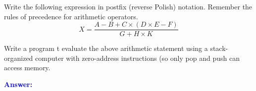 \item{}
\begin{list}{\textbf{)}}{}
    \item Write the following expression in postfix (reverse Polish) notation.
        Remember the rules of precedence for arithmetic operators.
        $$X=\frac{A-B+C\times(D\times E-F)}{G+H\times K}$$
    \item Write a program t evaluate the above arithmetic statement using a
        stack-organized computer with zero-address instructions (so only
        {\sc pop} and {\sc push} can access memory.
\end{list}
\vskip12pt
\ifanswers
\textcolor{blue}{
\textbf{Answer:}\\
}
\newpage
\fi
